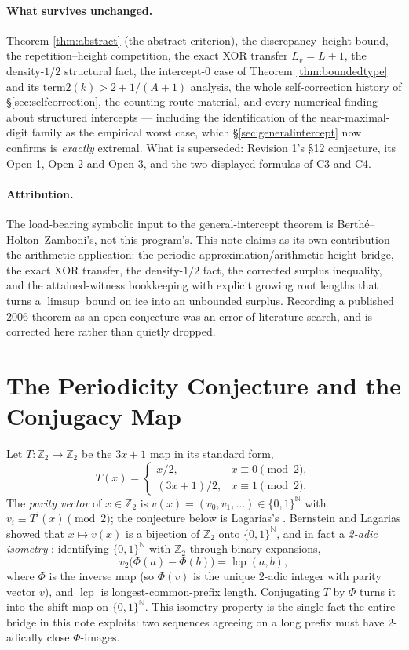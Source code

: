 \documentclass[11pt]{article}
\newcommand{\Z}{\mathbb{Z}}
\newcommand{\N}{\mathbb{N}}
\begin{document}
\paragraph{What survives unchanged.} Theorem \ref{thm:abstract} (the abstract criterion), the
discrepancy--height bound, the repetition--height competition, the exact XOR transfer
$L_v=L+1$, the density-$1/2$ structural fact, the intercept-$0$ case of
Theorem \ref{thm:boundedtype} and its $\text{term2}(k)>2+1/(A+1)$ analysis, the whole
self-correction history of \S\ref{sec:selfcorrection}, the counting-route material, and every
numerical finding about structured intercepts --- including the identification of the
near-maximal-digit family as the empirical worst case, which \S\ref{sec:generalintercept} now
confirms is \emph{exactly} extremal. What is superseded: Revision 1's \S12 conjecture, its Open 1,
Open 2 and Open 3, and the two displayed formulas of C3 and C4.

\paragraph{Attribution.} The load-bearing symbolic input to the general-intercept theorem is
Berth\'e--Holton--Zamboni's, not this program's. This note claims as its own contribution the
arithmetic application: the periodic-approximation/arithmetic-height bridge, the exact XOR
transfer, the density-$1/2$ fact, the corrected surplus inequality, and the attained-witness
bookkeeping with explicit growing root lengths that turns a $\limsup$ bound on $\text{ice}$ into an
unbounded surplus. Recording a published 2006 theorem as an open conjecture was an error of
literature search, and is corrected here rather than quietly dropped.

\section{The Periodicity Conjecture and the Conjugacy Map}
\label{sec:conjecture}

Let $T:\Z_2\to\Z_2$ be the $3x+1$ map in its standard form,
\[
T(x)=\begin{cases} x/2, & x\equiv 0 \pmod 2,\\ (3x+1)/2, & x\equiv 1\pmod 2.\end{cases}
\]
The \emph{parity vector} of $x\in\Z_2$ is $v(x)=(v_0,v_1,\dots)\in\{0,1\}^\N$ with $v_i\equiv T^i(x)\pmod 2$; the conjecture below is Lagarias's \cite{Lagarias1985}. Bernstein and Lagarias showed that $x\mapsto v(x)$ is a bijection of $\Z_2$ onto $\{0,1\}^\N$, and in fact a \emph{2-adic isometry} \cite{BernsteinLagarias1996,Bernstein1994}: identifying $\{0,1\}^\N$ with $\Z_2$ through binary expansions,
\[
v_2\bigl(\Phi(a)-\Phi(b)\bigr) = \operatorname{lcp}(a,b),
\]
where $\Phi$ is the inverse map (so $\Phi(v)$ is the unique 2-adic integer with parity vector $v$), and $\operatorname{lcp}$ is longest-common-prefix length. Conjugating $T$ by $\Phi$ turns it into the shift map on $\{0,1\}^\N$. This isometry property is the single fact the entire bridge in this note exploits: two sequences agreeing on a long prefix must have 2-adically close $\Phi$-images.
\end{document}
